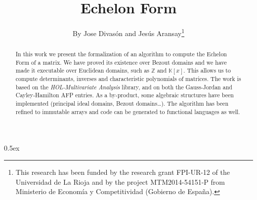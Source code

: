 \documentclass[11pt,a4paper]{article}
\begin{document}
\title{Echelon Form}
\author{By Jose Divas\'on and Jes\'us Aransay\thanks{This research has been funded 
  by the research grant FPI-UR-12 of the Universidad de La Rioja and by the project MTM2014-54151-P from Ministerio de Econom\'ia y Competitividad
(Gobierno de Espa\~na).}}
\maketitle

\begin{abstract}
In this work we present the formalization of an algorithm to compute the Echelon Form of
a matrix. We have proved its existence over Bezout domains and we have made it
executable over Euclidean domains, such as $\mathbb{Z}$ and $\mathbb{K}[x]$. This allows us
to compute determinants, inverses and characteristic polynomials of matrices.
The work is based on the \emph{HOL-Multivariate Analysis} library, and on both the Gauss-Jordan 
and Cayley-Hamilton AFP entries. As a by-product, some algebraic structures have been implemented (principal ideal domains, Bezout domains\dots).
The algorithm has been refined to immutable arrays and code can be generated to 
functional languages as well.
\end{abstract}

\tableofcontents

\parindent 0pt\parskip 0.5ex


\end{document}
